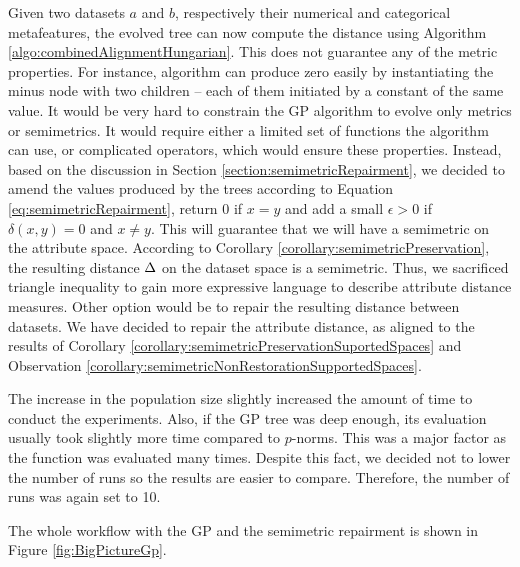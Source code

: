  Given two datasets $a$ and $b$, respectively their numerical and categorical metafeatures, the evolved tree can now compute the distance using Algorithm \ref{algo:combinedAlignmentHungarian}. This does not guarantee any of the metric properties. For instance, algorithm can produce zero easily by instantiating the minus node with two children -- each of them initiated by a constant of the same value. It would be very hard to constrain the GP algorithm to evolve only metrics or semimetrics. It would require either a limited set of functions the algorithm can use,
 or complicated operators, which would ensure these properties. Instead, based on the discussion in Section \ref{section:semimetricRepairment}, we decided to amend the values produced by the trees according to Equation \ref{eq:semimetricRepairment}, return $0$ if $x=y$ and add a small $\epsilon > 0$ if $\delta(x,y)=0$ and $x \neq y$. This will guarantee that we will have a semimetric on the attribute space.
 According to Corollary \ref{corollary:semimetricPreservation}, the resulting distance $\Delta$ on the dataset space is a semimetric. Thus, we sacrificed triangle inequality to gain more expressive language to describe attribute distance measures. Other option would be to repair the resulting distance between datasets. We have decided to repair the attribute distance, as aligned to the results of Corollary \ref{corollary:semimetricPreservationSuportedSpaces} and Observation \ref{corollary:semimetricNonRestorationSupportedSpaces}.
 
 The increase in the population size slightly increased the amount of time to conduct the experiments. Also, if the GP tree was deep enough, its evaluation usually took slightly more time compared to $p$-norms. This was a major factor as the function was evaluated many times. Despite this fact, we decided not to lower the number of runs so the results are easier to compare. Therefore, the number of runs was again set to 10.
 
 The whole workflow with the GP and the semimetric repairment is shown in Figure \ref{fig:BigPictureGp}.
 
